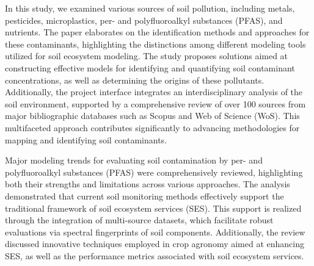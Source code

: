 \documentclass[sn-mathphys-num]{sn-jnl}
\begin{document}
In this study, we examined various sources of soil pollution, including
metals, pesticides, microplastics, per- and polyfluoroalkyl substances
(PFAS), and nutrients. The paper elaborates on the identification methods and
approaches for these contaminants, highlighting the distinctions among
different modeling tools utilized for soil ecosystem modeling. The study
proposes solutions aimed at constructing effective models for identifying and
quantifying soil contaminant concentrations, as well as determining the
origins of these pollutants. Additionally, the project interface integrates an
interdisciplinary analysis of the soil environment, supported by a
comprehensive review of over 100 sources from major bibliographic databases
such as Scopus and Web of Science (WoS). This multifaceted approach
contributes significantly to advancing methodologies for mapping and
identifying soil contaminants.

Major modeling trends for evaluating soil contamination by per- and
polyfluoroalkyl substances (PFAS) were comprehensively reviewed, highlighting
both their strengths and limitations across various approaches. The analysis
demonstrated that current soil monitoring methods effectively support the
traditional framework of soil ecosystem services (SES). This support is
realized through the integration of multi-source datasets, which facilitate
robust evaluations via spectral fingerprints of soil components. Additionally,
the review discussed innovative techniques employed in crop agronomy aimed at
enhancing SES, as well as the performance metrics associated with soil
ecosystem services.

\end{document}
